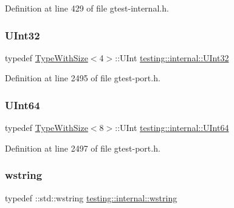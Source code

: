 Definition at line 429 of file gtest-\/internal.\+h.

\mbox{\label{namespacetesting_1_1internal_a40d4fffcd2bf56f18b1c380615aa85e3}} 
\subsubsection{\texorpdfstring{U\+Int32}{UInt32}}
{\footnotesize\ttfamily typedef \hyperlink{classtesting_1_1internal_1_1TypeWithSize}{Type\+With\+Size}$<$4$>$\+::U\+Int \hyperlink{namespacetesting_1_1internal_a40d4fffcd2bf56f18b1c380615aa85e3}{testing\+::internal\+::\+U\+Int32}}



Definition at line 2495 of file gtest-\/port.\+h.

\mbox{\label{namespacetesting_1_1internal_aa6a1ac454e6d7e550fa4925c62c35caa}} 
\subsubsection{\texorpdfstring{U\+Int64}{UInt64}}
{\footnotesize\ttfamily typedef \hyperlink{classtesting_1_1internal_1_1TypeWithSize}{Type\+With\+Size}$<$8$>$\+::U\+Int \hyperlink{namespacetesting_1_1internal_aa6a1ac454e6d7e550fa4925c62c35caa}{testing\+::internal\+::\+U\+Int64}}



Definition at line 2497 of file gtest-\/port.\+h.

\mbox{\label{namespacetesting_1_1internal_a3f543179329c353aee1d7b54a9a8e335}} 
\subsubsection{\texorpdfstring{wstring}{wstring}}
{\footnotesize\ttfamily typedef \+::std\+::wstring \hyperlink{namespacetesting_1_1internal_a3f543179329c353aee1d7b54a9a8e335}{testing\+::internal\+::wstring}}



